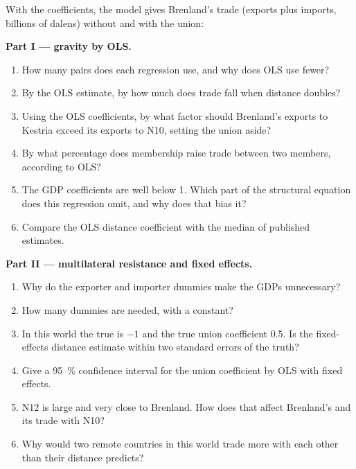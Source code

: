 \begin{problem}
\begin{center}
\end{center}
With the  coefficients, the model gives Brenland's trade (exports plus
imports, billions of dalens) without and with the union:
\begin{center}\small
{}
\end{center}

\medskip\noindent\textbf{Part I --- gravity by OLS.}
\begin{enumerate}
\item How many pairs does each regression use, and why does OLS use fewer?
\item By the OLS estimate, by how much does trade fall when distance doubles?
\item Using the OLS coefficients, by what factor should Brenland's exports to
Kestria exceed its exports to N10, setting the union aside?
\item By what percentage does membership raise trade between two members,
according to OLS?
\item The GDP coefficients are well below 1. Which part of the structural equation
does this regression omit, and why does that bias it?
\item Compare the OLS distance coefficient with the median of published
estimates.
\end{enumerate}

\medskip\noindent\textbf{Part II --- multilateral resistance and fixed effects.}
\begin{enumerate}[resume]
\item Why do the exporter and importer dummies make the GDPs unnecessary?
\item How many dummies are needed, with a constant?
\item In this world the true  is $-1$ and the true union
coefficient 0.5. Is the fixed-effects distance estimate within two standard
errors of the truth?
\item Give a 95~\% confidence interval for the union coefficient by OLS with
fixed effects.
\item N12 is large and very close to Brenland. How does that affect Brenland's
 and its trade with N10?
\item Why would two remote countries in this world trade more with each other
than their distance predicts?
\end{enumerate}


\end{problem}
